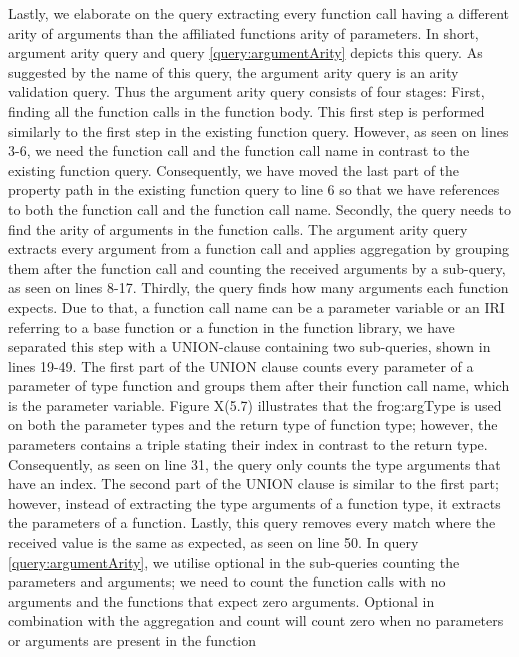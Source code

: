 \para 
Lastly, we elaborate on the query extracting every function call having a different arity of arguments than the affiliated functions arity of parameters. In short, argument arity query and query \ref{query:argumentArity} depicts this query. As suggested by the name of this query, the argument arity query is an arity validation query. Thus the argument arity query consists of four stages: First, finding all the function calls in the function body. This first step is performed similarly to the first step in the existing function query. However, as seen on lines 3-6, we need the function call and the function call name in contrast to the existing function query. Consequently, we have moved the last part of the property path in the existing function query to line 6 so that we have references to both the function call and the function call name. Secondly, the query needs to find the arity of arguments in the function calls. The argument arity query extracts every argument from a function call and applies aggregation by grouping them after the function call and counting the received arguments by a sub-query, as seen on lines 8-17. Thirdly, the query finds how many arguments each function expects. Due to that, a function call name can be a parameter variable or an IRI referring to a base function or a function in the function library, we have separated this step with a UNION-clause containing two sub-queries, shown in lines 19-49. The first part of the UNION clause counts every parameter of a parameter of type function and groups them after their function call name, which is the parameter variable. Figure X(5.7) illustrates that the frog:argType is used on both the parameter types and the return type of function type; however, the parameters contains a triple stating their index in contrast to the return type. Consequently, as seen on line 31, the query only counts the type arguments that have an index. The second part of the UNION clause is similar to the first part; however, instead of extracting the type arguments of a function type, it extracts the parameters of a function. Lastly, this query removes every match where the received value is the same as expected, as seen on line 50. In query \ref{query:argumentArity}, we utilise optional in the sub-queries counting the parameters and arguments; we need to count the function calls with no arguments and the functions that expect zero arguments. Optional in combination with the aggregation and count will count zero when no parameters or arguments are present in the function

